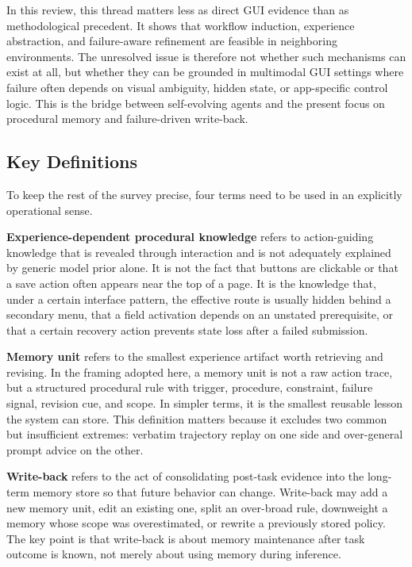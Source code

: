 \documentclass{article}
\begin{document}
In this review, this thread matters less as direct GUI evidence than as
methodological precedent. It shows that workflow induction, experience
abstraction, and failure-aware refinement are feasible in neighboring
environments. The unresolved issue is therefore not whether such
mechanisms can exist at all, but whether they can be grounded in
multimodal GUI settings where failure often depends on visual ambiguity,
hidden state, or app-specific control logic. This is the bridge between
self-evolving agents and the present focus on procedural memory and
failure-driven write-back.

\subsection{Key Definitions}\label{32-key-definitions}

To keep the rest of the survey precise, four terms need to be used in an
explicitly operational sense.

\textbf{Experience-dependent procedural knowledge} refers to
action-guiding knowledge that is revealed through interaction and is not
adequately explained by generic model prior alone. It is not the fact
that buttons are clickable or that a save action often appears near the
top of a page. It is the knowledge that, under a certain interface
pattern, the effective route is usually hidden behind a secondary menu,
that a field activation depends on an unstated prerequisite, or that a
certain recovery action prevents state loss after a failed submission.

\textbf{Memory unit} refers to the smallest experience artifact worth
retrieving and revising. In the framing adopted here, a memory unit is
not a raw action trace, but a structured procedural rule with trigger,
procedure, constraint, failure signal, revision cue, and scope. In
simpler terms, it is the smallest reusable lesson the system can store.
This definition matters because it excludes two common but insufficient
extremes: verbatim trajectory replay on one side and over-general prompt
advice on the other.

\textbf{Write-back} refers to the act of consolidating post-task
evidence into the long-term memory store so that future behavior can
change. Write-back may add a new memory unit, edit an existing one,
split an over-broad rule, downweight a memory whose scope was
overestimated, or rewrite a previously stored policy. The key point is
that write-back is about memory maintenance after task outcome is known,
not merely about using memory during inference.
\end{document}

